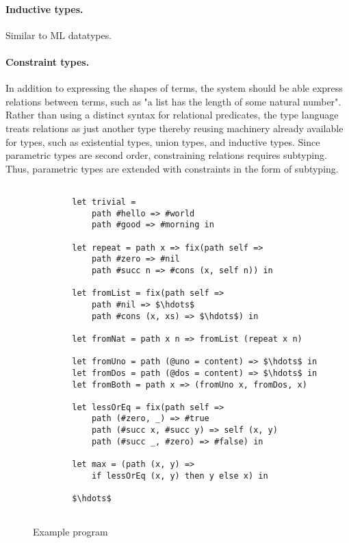 \documentclass[acmsmall]{acmart}
\begin{document}
\paragraph{Inductive types.} Similar to ML datatypes.

\paragraph{Constraint types.}
In addition to expressing the shapes of terms, the system should be able express relations between terms,
such as "a list has the length of some natural number".
Rather than using a distinct syntax for relational predicates, 
the type language treats relations as just another type thereby reusing machinery already 
available for types, such as existential types, union types, and inductive types.
Since parametric types are second order, constraining relations requires subtyping.
Thus, parametric types are extended with constraints in the form of subtyping.



\begin{figure*}[h]

    \begin{lstlisting}[mathescape=true]

        let trivial =
            path #hello => #world
            path #good => #morning in

        let repeat = path x => fix(path self =>
            path #zero => #nil
            path #succ n => #cons (x, self n)) in

        let fromList = fix(path self =>
            path #nil => $\hdots$
            path #cons (x, xs) => $\hdots$) in

        let fromNat = path x n => fromList (repeat x n)

        let fromUno = path (@uno = content) => $\hdots$ in
        let fromDos = path (@dos = content) => $\hdots$ in
        let fromBoth = path x => (fromUno x, fromDos, x)

        let lessOrEq = fix(path self =>
            path (#zero, _) => #true
            path (#succ x, #succ y) => self (x, y)
            path (#succ _, #zero) => #false) in

        let max = (path (x, y) => 
            if lessOrEq (x, y) then y else x) in

        $\hdots$


    \end{lstlisting}

\caption{Example program}
\label{fig:program}
\end{figure*}
\end{document}

